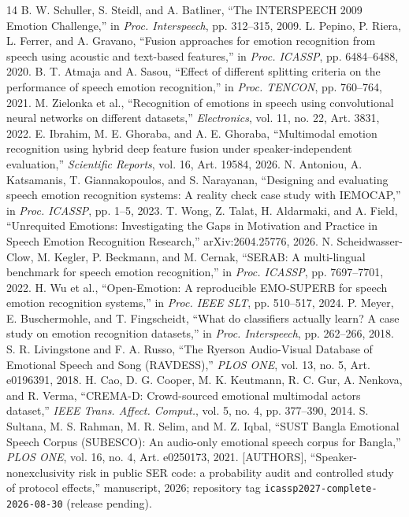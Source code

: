 \documentclass{article}
\begin{document}
\clearpage
\begin{thebibliography}{14}
 B. W. Schuller, S. Steidl, and A. Batliner, ``The INTERSPEECH 2009 Emotion Challenge,'' in \emph{Proc. Interspeech}, pp. 312--315, 2009.
 L. Pepino, P. Riera, L. Ferrer, and A. Gravano, ``Fusion approaches for emotion recognition from speech using acoustic and text-based features,'' in \emph{Proc. ICASSP}, pp. 6484--6488, 2020.
 B. T. Atmaja and A. Sasou, ``Effect of different splitting criteria on the performance of speech emotion recognition,'' in \emph{Proc. TENCON}, pp. 760--764, 2021.
 M. Zielonka et al., ``Recognition of emotions in speech using convolutional neural networks on different datasets,'' \emph{Electronics}, vol. 11, no. 22, Art. 3831, 2022.
 E. Ibrahim, M. E. Ghoraba, and A. E. Ghoraba, ``Multimodal emotion recognition using hybrid deep feature fusion under speaker-independent evaluation,'' \emph{Scientific Reports}, vol. 16, Art. 19584, 2026.
 N. Antoniou, A. Katsamanis, T. Giannakopoulos, and S. Narayanan, ``Designing and evaluating speech emotion recognition systems: A reality check case study with IEMOCAP,'' in \emph{Proc. ICASSP}, pp. 1--5, 2023.
 T. Wong, Z. Talat, H. Aldarmaki, and A. Field, ``Unrequited Emotions: Investigating the Gaps in Motivation and Practice in Speech Emotion Recognition Research,'' arXiv:2604.25776, 2026.
 N. Scheidwasser-Clow, M. Kegler, P. Beckmann, and M. Cernak, ``SERAB: A multi-lingual benchmark for speech emotion recognition,'' in \emph{Proc. ICASSP}, pp. 7697--7701, 2022.
 H. Wu et al., ``Open-Emotion: A reproducible EMO-SUPERB for speech emotion recognition systems,'' in \emph{Proc. IEEE SLT}, pp. 510--517, 2024.
 P. Meyer, E. Buschermohle, and T. Fingscheidt, ``What do classifiers actually learn? A case study on emotion recognition datasets,'' in \emph{Proc. Interspeech}, pp. 262--266, 2018.
 S. R. Livingstone and F. A. Russo, ``The Ryerson Audio-Visual Database of Emotional Speech and Song (RAVDESS),'' \emph{PLOS ONE}, vol. 13, no. 5, Art. e0196391, 2018.
 H. Cao, D. G. Cooper, M. K. Keutmann, R. C. Gur, A. Nenkova, and R. Verma, ``CREMA-D: Crowd-sourced emotional multimodal actors dataset,'' \emph{IEEE Trans. Affect. Comput.}, vol. 5, no. 4, pp. 377--390, 2014.
 S. Sultana, M. S. Rahman, M. R. Selim, and M. Z. Iqbal, ``SUST Bangla Emotional Speech Corpus (SUBESCO): An audio-only emotional speech corpus for Bangla,'' \emph{PLOS ONE}, vol. 16, no. 4, Art. e0250173, 2021.
 [AUTHORS], ``Speaker-nonexclusivity risk in public SER code: a probability audit and controlled study of protocol effects,'' manuscript, 2026; repository tag \texttt{icassp2027-complete-2026-08-30} (release pending).
\end{thebibliography}
\end{document}
